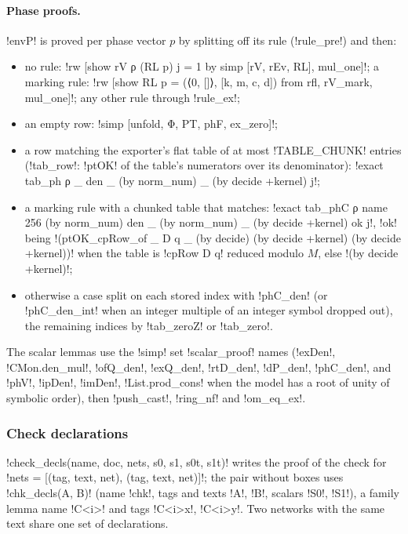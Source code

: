 {{{\paragraph{Phase proofs.} \lexlean!envP! is proved per phase vector $p$ by splitting off its rule
(\lexpy!rule_pre!) and then:
\begin{itemize}
\item no rule: \lexlean!rw [show rV ρ (RL p) j = 1 by simp [rV, rEv, RL], mul_one]!; a marking
rule: \lexlean!rw [show RL p = (⟨0, []⟩, [k, m, c, d]) from rfl, rV_mark, mul_one]!; any other
rule through \lexlean!rule_ex!;
\item an empty row: \lexlean!simp [unfold, Φ, PT, phF, ex_zero]!;
\item a row matching the exporter's flat table of at most \lexpy!TABLE_CHUNK! entries
(\lexpy!tab_row!: \lexlean!ptOK! of the table's numerators over its denominator):
\lexlean!exact tab_ph ρ _ den _ (by norm_num) _ (by decide +kernel) j!;
\item a marking rule with a chunked table that matches: \lexlean!exact tab_phC ρ name 256 (by norm_num) den _ (by norm_num) _ (by decide +kernel) ok j!,
\lexlean!ok! being \lexlean!(ptOK_cpRow_of _ D q _ (by decide) (by decide +kernel) (by decide +kernel))!
when the table is \lexlean!cpRow D q! reduced modulo $M$, else \lexlean!(by decide +kernel)!;
\item otherwise a case split on each stored index with \lexlean!phC_den! (or \lexlean!phC_den_int!
when an integer multiple of an integer symbol dropped out), the remaining indices by
\lexlean!tab_zeroZ! or \lexlean!tab_zero!.
\end{itemize}
The scalar lemmas use the \lexlean!simp! set \lexpy!scalar_proof! names (\lexlean!exDen!,
\lexlean!CMon.den_mul!, \lexlean!ofQ_den!, \lexlean!exQ_den!, \lexlean!rtD_den!, \lexlean!dP_den!,
\lexlean!phC_den!, and \lexlean!phV!, \lexlean!ipDen!, \lexlean!imDen!, \lexlean!List.prod_cons! when the
model has a root of unity of symbolic order), then \lexlean!push_cast!, \lexlean!ring_nf! and
\lexlean!om_eq_ex!.

\subsubsection{Check declarations}\label{sec:lean-export-sym-checkdecls}

\lexpy!check_decls(name, doc, nets, s0, s1, s0t, s1t)! writes the proof of the check for
\lexpy!nets = [(tag, text, net), (tag, text, net)]!; the pair without boxes uses
\lexpy!chk_decls(A, B)! (name \lexlean!chk!, tags and texts \lexlean!A!, \lexlean!B!, scalars \lexlean!S0!,
\lexlean!S1!), a family lemma name \lexlean!C<i>! and tags \lexlean!C<i>x!, \lexlean!C<i>y!. Two networks
with the same text share one set of declarations.

}}}
